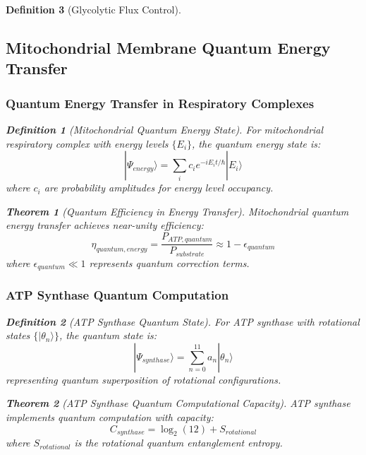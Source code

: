 \documentclass[12pt,a4paper]{article}
\newtheorem{theorem}{Theorem}
\newtheorem{definition}{Definition}
\begin{document}
\begin{definition}[Glycolytic Flux Control]
\subsection{Mitochondrial Membrane Quantum Energy Transfer}

\subsubsection{Quantum Energy Transfer in Respiratory Complexes}

\begin{definition}[Mitochondrial Quantum Energy State]
For mitochondrial respiratory complex with energy levels $\{E_i\}$, the quantum energy state is:
\begin{equation}
|\Psi_{energy}\rangle = \sum_{i} c_i e^{-iE_i t/\hbar} |E_i\rangle
\end{equation}
where $c_i$ are probability amplitudes for energy level occupancy.
\end{definition}

\begin{theorem}[Quantum Efficiency in Energy Transfer]
Mitochondrial quantum energy transfer achieves near-unity efficiency:
\begin{equation}
\eta_{quantum,energy} = \frac{P_{ATP,quantum}}{P_{substrate}} \approx 1 - \epsilon_{quantum}
\end{equation}
where $\epsilon_{quantum} \ll 1$ represents quantum correction terms.
\end{theorem}

\subsubsection{ATP Synthase Quantum Computation}

\begin{definition}[ATP Synthase Quantum State]
For ATP synthase with rotational states $\{|\theta_n\rangle\}$, the quantum state is:
\begin{equation}
|\Psi_{synthase}\rangle = \sum_{n=0}^{11} a_n |\theta_n\rangle
\end{equation}
representing quantum superposition of rotational configurations.
\end{definition}

\begin{theorem}[ATP Synthase Quantum Computational Capacity]
ATP synthase implements quantum computation with capacity:
\begin{equation}
C_{synthase} = \log_2(12) + S_{rotational}
\end{equation}
where $S_{rotational}$ is the rotational quantum entanglement entropy.
\end{theorem}


\end{definition}
\end{document}
